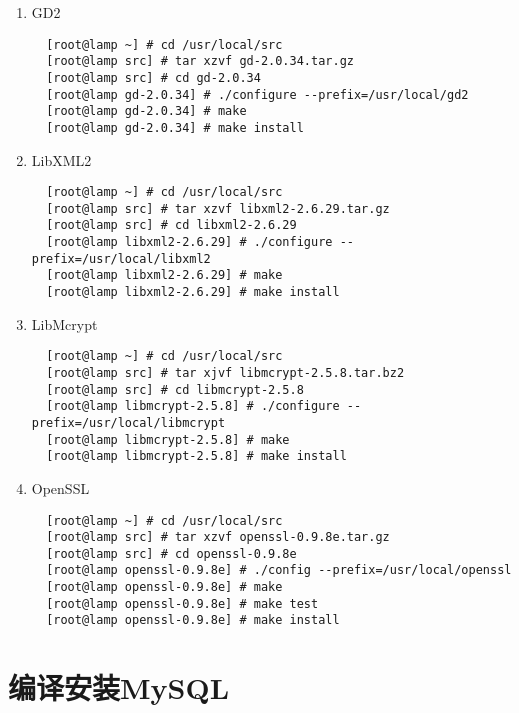 \begin{enumerate}[itemsep=0pt,parsep=0pt]
\item GD2
  \small{
\begin{verbatim}
  [root@lamp ~] # cd /usr/local/src
  [root@lamp src] # tar xzvf gd-2.0.34.tar.gz
  [root@lamp src] # cd gd-2.0.34
  [root@lamp gd-2.0.34] # ./configure --prefix=/usr/local/gd2
  [root@lamp gd-2.0.34] # make
  [root@lamp gd-2.0.34] # make install  
\end{verbatim}
  }
  \normalsize

\item LibXML2
  \small{
\begin{verbatim}
  [root@lamp ~] # cd /usr/local/src
  [root@lamp src] # tar xzvf libxml2-2.6.29.tar.gz
  [root@lamp src] # cd libxml2-2.6.29
  [root@lamp libxml2-2.6.29] # ./configure --prefix=/usr/local/libxml2
  [root@lamp libxml2-2.6.29] # make
  [root@lamp libxml2-2.6.29] # make install
\end{verbatim}
  }
  \normalsize

\item LibMcrypt
  \small{
\begin{verbatim}
  [root@lamp ~] # cd /usr/local/src
  [root@lamp src] # tar xjvf libmcrypt-2.5.8.tar.bz2
  [root@lamp src] # cd libmcrypt-2.5.8
  [root@lamp libmcrypt-2.5.8] # ./configure --prefix=/usr/local/libmcrypt
  [root@lamp libmcrypt-2.5.8] # make
  [root@lamp libmcrypt-2.5.8] # make install
\end{verbatim}
  }
  \normalsize

\item OpenSSL
  \small{
\begin{verbatim}
  [root@lamp ~] # cd /usr/local/src
  [root@lamp src] # tar xzvf openssl-0.9.8e.tar.gz
  [root@lamp src] # cd openssl-0.9.8e
  [root@lamp openssl-0.9.8e] # ./config --prefix=/usr/local/openssl
  [root@lamp openssl-0.9.8e] # make
  [root@lamp openssl-0.9.8e] # make test
  [root@lamp openssl-0.9.8e] # make install
\end{verbatim}
  }
  \normalsize

\end{enumerate}

\section{编译安装MySQL}

